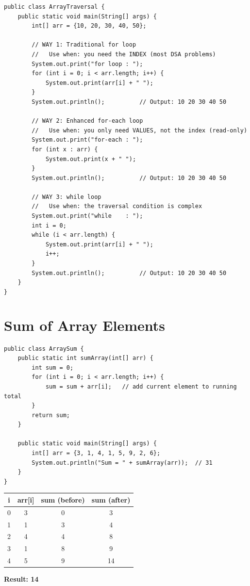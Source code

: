 \documentclass[12pt,a4paper,oneside]{book}
\begin{document}
\begin{lstlisting}[caption={Three ways to traverse --- when to use each}]
public class ArrayTraversal {
    public static void main(String[] args) {
        int[] arr = {10, 20, 30, 40, 50};

        // WAY 1: Traditional for loop
        //   Use when: you need the INDEX (most DSA problems)
        System.out.print("for loop : ");
        for (int i = 0; i < arr.length; i++) {
            System.out.print(arr[i] + " ");
        }
        System.out.println();          // Output: 10 20 30 40 50

        // WAY 2: Enhanced for-each loop
        //   Use when: you only need VALUES, not the index (read-only)
        System.out.print("for-each : ");
        for (int x : arr) {
            System.out.print(x + " ");
        }
        System.out.println();          // Output: 10 20 30 40 50

        // WAY 3: while loop
        //   Use when: the traversal condition is complex
        System.out.print("while    : ");
        int i = 0;
        while (i < arr.length) {
            System.out.print(arr[i] + " ");
            i++;
        }
        System.out.println();          // Output: 10 20 30 40 50
    }
}
\end{lstlisting}

\section{Sum of Array Elements}

\begin{lstlisting}[caption={Sum of all elements --- accumulator pattern}]
public class ArraySum {
    public static int sumArray(int[] arr) {
        int sum = 0;
        for (int i = 0; i < arr.length; i++) {
            sum = sum + arr[i];   // add current element to running total
        }
        return sum;
    }

    public static void main(String[] args) {
        int[] arr = {3, 1, 4, 1, 5, 9, 2, 6};
        System.out.println("Sum = " + sumArray(arr));  // 31
    }
}
\end{lstlisting}

\begin{dryrun}[Dry Run: arr = \{3, 1, 4, 1, 5\}]
\begin{center}
\begin{tabular}{cccc}
\toprule
\textbf{i} & \textbf{arr[i]} & \textbf{sum (before)} & \textbf{sum (after)}\\
\midrule
0 & 3 & 0  & 3\\
1 & 1 & 3  & 4\\
2 & 4 & 4  & 8\\
3 & 1 & 8  & 9\\
4 & 5 & 9  & 14\\
\bottomrule
\end{tabular}
\end{center}
\textbf{Result: 14}
\end{dryrun}
\end{document}
